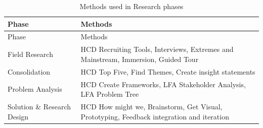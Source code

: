 \hypertarget{tbl:research-methods}{}
\begin{longtable}[]{@{}ll@{}}
\caption{\label{tbl:research-methods}Methods used in Research phases}\tabularnewline
\toprule
\begin{minipage}[b]{0.28\columnwidth}\raggedright
Phase\strut
\end{minipage} & \begin{minipage}[b]{0.66\columnwidth}\raggedright
Methods\strut
\end{minipage}\tabularnewline
\midrule
\endfirsthead
\toprule
\begin{minipage}[b]{0.28\columnwidth}\raggedright
Phase\strut
\end{minipage} & \begin{minipage}[b]{0.66\columnwidth}\raggedright
Methods\strut
\end{minipage}\tabularnewline
\midrule
\endhead
\begin{minipage}[t]{0.28\columnwidth}\raggedright
Field Research\strut
\end{minipage} & \begin{minipage}[t]{0.66\columnwidth}\raggedright
HCD Recruiting Tools, Interviews, Extremes and Mainstream, Immersion, Guided Tour\strut
\end{minipage}\tabularnewline
\begin{minipage}[t]{0.28\columnwidth}\raggedright
Consolidation\strut
\end{minipage} & \begin{minipage}[t]{0.66\columnwidth}\raggedright
HCD Top Five, Find Themes, Create insight statements\strut
\end{minipage}\tabularnewline
\begin{minipage}[t]{0.28\columnwidth}\raggedright
Problem Analysis\strut
\end{minipage} & \begin{minipage}[t]{0.66\columnwidth}\raggedright
HCD Create Frameworks, LFA Stakeholder Analysis, LFA Problem Tree\strut
\end{minipage}\tabularnewline
\begin{minipage}[t]{0.28\columnwidth}\raggedright
Solution \& Research Design\strut
\end{minipage} & \begin{minipage}[t]{0.66\columnwidth}\raggedright
HCD How might we, Brainstorm, Get Visual, Prototyping, Feedback integration and iteration\strut
\end{minipage}\tabularnewline
\bottomrule
\end{longtable}

